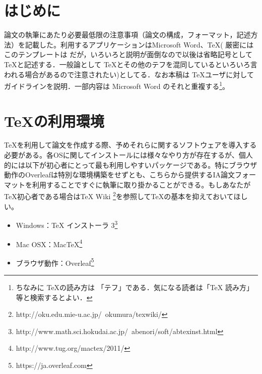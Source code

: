 \documentclass[a4paper,uplatex]{jsarticle}
\begin{document}
\newpage %

\setcounter{page}{1} %
\pagestyle{plain}

\section{はじめに}

論文の執筆にあたり必要最低限の注意事項（論文の構成，フォーマット，記述方法）を記載した。利用するアプリケーションはMicrosoft Word、\TeX ( 厳密にはこのテンプレートは \pLaTeXe だが，いろいろと説明が面倒なので以後は省略記号として \TeX と記述する．一般論として \TeX とその他のテフを混同しているといろいろ言われる場合があるので注意されたい)としてる．なお本稿は \TeX ユーザに対してガイドラインを説明．一部内容は Microsoft Word のそれと重複する\footnote{ちなみに \TeX の読み方は 「テフ」である．気になる読者は「TeX 読み方」等と検索するとよい．}。

\section{\TeX の利用環境}
\TeX を利用して論文を作成する際、予めそれらに関するソフトウェアを導入する必要がある。各OSに関してインストールには様々なやり方が存在するが、個人的には以下が初心者にとって最も利用しやすいパッケージである。特にブラウザ動作のOverleafは特別な環境構築をせずとも、こちらから提供するIA論文フォーマットを利用することですぐに執筆に取り掛かることができる。もしあなたが\TeX 初心者である場合はTeX Wiki \footnote{http://oku.edu.mie-u.ac.jp/~okumura/texwiki/}を参照してTeXの基本を抑えておいてほしい。
\begin{itemize}
\item Windows：TeX インストーラ 3\footnote{http://www.math.sci.hokudai.ac.jp/~abenori/soft/abtexinst.html}
\item Mac OSX：MacTeX\footnote{http://www.tug.org/mactex/2011/}
\item ブラウザ動作：Overleaf\footnote{https://ja.overleaf.com}
\end{itemize}
\end{document}
